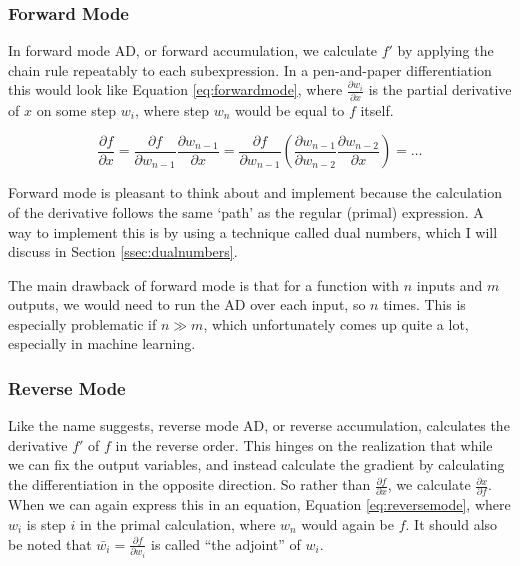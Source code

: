 \documentclass{article}
\begin{document}
            \subsubsection{Forward Mode}
                In forward mode AD, or forward accumulation, we calculate $f'$ by applying the chain rule repeatably to each subexpression.
                In a pen-and-paper differentiation this would look like Equation \ref{eq:forwardmode}, where $\tfrac{\partial w_i}{\partial x}$ is the partial derivative of $x$ on some step $w_i$, where step $w_n$ would be equal to $f$ itself.

                \begin{equation} \label{eq:forwardmode}
                    \frac{\partial f}{\partial x}=\frac{\partial f}{\partial w_{n-1}}\frac{\partial w_{n-1}}{\partial x}=\frac{\partial f}{\partial w_{n-1}}\left(\frac{\partial w_{n-1}}{\partial w_{n-2}}\frac{\partial w_{n-2}}{\partial x}\right)=\dots
                \end{equation}

                Forward mode is pleasant to think about and implement because the calculation of the derivative follows the same `path' as the regular (primal) expression.
                A way to implement this is by using a technique called dual numbers, which I will discuss in Section \ref{ssec:dualnumbers}.
                
                The main drawback of forward mode is that for a function with $n$ inputs and $m$ outputs, we would need to run the AD over each input, so $n$ times.
                This is especially problematic if $n\gg m$, which unfortunately comes up quite a lot, especially in machine learning.

            \subsubsection{Reverse Mode}
                Like the name suggests, reverse mode AD, or reverse accumulation, calculates the derivative $f'$ of $f$ in the reverse order.
                This hinges on the realization that while we can fix the output variables, and instead calculate the gradient by calculating the differentiation in the opposite direction.
                So rather than $\tfrac{\partial f}{\partial x}$, we calculate $\tfrac{\partial x}{\partial f}$.
                When we can again express this in an equation, Equation \ref{eq:reversemode}, where $w_i$ is step $i$ in the primal calculation, where $w_n$ would again be $f$.
                It should also be noted that $\bar{w_i}=\tfrac{\partial f}{\partial w_i}$ is called ``the adjoint'' of $w_i$.
                
\end{document}
